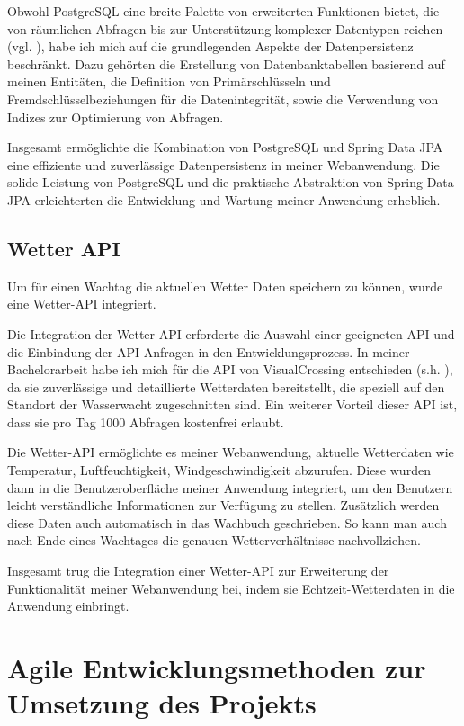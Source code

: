 \documentclass[fontsize=12pt,openright,oneside,paper=a4,BCOR=1cm]{scrbook}
\begin{document}
Obwohl PostgreSQL eine breite Palette von erweiterten Funktionen bietet, die von räumlichen Abfragen bis zur Unterstützung komplexer Datentypen reichen (vgl. \cite{postgres}), habe ich mich auf die grundlegenden Aspekte der Datenpersistenz beschränkt. Dazu gehörten die Erstellung von Datenbanktabellen basierend auf meinen Entitäten, die Definition von Primärschlüsseln und Fremdschlüsselbeziehungen für die Datenintegrität, sowie die Verwendung von Indizes zur Optimierung von Abfragen.

Insgesamt ermöglichte die Kombination von PostgreSQL und Spring Data JPA eine effiziente und zuverlässige Datenpersistenz in meiner Webanwendung. Die solide Leistung von PostgreSQL und die praktische Abstraktion von Spring Data JPA erleichterten die Entwicklung und Wartung meiner Anwendung erheblich.

\subsection{Wetter API}
Um für einen Wachtag die aktuellen Wetter Daten speichern zu können, wurde eine Wetter-API integriert.

Die Integration der Wetter-API erforderte die Auswahl einer geeigneten API und die Einbindung der API-Anfragen in den Entwicklungsprozess. In meiner Bachelorarbeit habe ich mich für die API von VisualCrossing entschieden (s.h. \cite{weatherapi}), da sie zuverlässige und detaillierte Wetterdaten bereitstellt, die speziell auf den Standort der Wasserwacht zugeschnitten sind. Ein weiterer Vorteil dieser API ist, dass sie pro Tag 1000 Abfragen kostenfrei erlaubt.

Die Wetter-API ermöglichte es meiner Webanwendung, aktuelle Wetterdaten wie Temperatur, Luftfeuchtigkeit, Windgeschwindigkeit abzurufen. Diese wurden dann in die Benutzeroberfläche meiner Anwendung integriert, um den Benutzern leicht verständliche Informationen zur Verfügung zu stellen. Zusätzlich werden diese Daten auch automatisch in das Wachbuch geschrieben. So kann man auch nach Ende eines Wachtages die genauen Wetterverhältnisse nachvollziehen.

Insgesamt trug die Integration einer Wetter-API zur Erweiterung der Funktionalität meiner Webanwendung bei, indem sie Echtzeit-Wetterdaten in die Anwendung einbringt.


\section{Agile Entwicklungsmethoden zur Umsetzung des Projekts}
\end{document}
